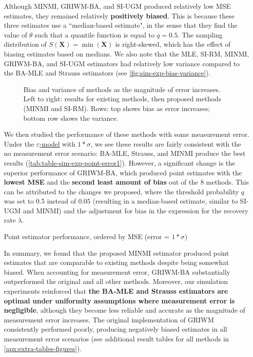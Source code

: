 Although MINMI, GRIWM-BA, and SI-UGM produced relatively low MSE estimates, they remained relatively \textbf{positively biased}. This is because these three estimates use a ``median-based estimate", in the sense that they find the value of $\theta$ such that a quantile function is equal to $q = 0.5$. The sampling distribution of $S(\bm{X}) = \min(\bm{X})$ is right-skewed, which has the effect of biasing estimates based on medians. We also note that the MLE, SI-RM, MINMI, GRIWM-BA, and SI-UGM estimators had relatively low variance compared to the BA-MLE and Strauss estimators (see \autoref{fig:sim-exp-bias-variance}).
\begin{figure}[ht]
    \centering
    
    \caption{Bias and variance of methods as the magnitude of error increases. Left to right: results for existing methods, then proposed methods (MINMI and SI-RM). Rows: top shows bias as error increases; bottom row shows the variance.}
    \label{fig:sim-exp-bias-variance}
\end{figure}

We then studied the performance of these methods with some measurement error. Under the  \hyperref[model: measurement-error]{$\varepsilon$-model} with $1*\sigma$, we see these results are fairly consistent with the no measurement error scenario: BA-MLE, Strauss, and MINMI produce the best results (\autoref{tab:table-sim-exp-point-error1}). However, a significant change is the superior performance of GRIWM-BA, which produced point estimates with the \textbf{lowest MSE} and the \textbf{second least amount of bias} out of the 8 methods. This can be attributed to the changes we proposed, where the threshold probability $q$ was set to 0.5 instead of $0.05$ (resulting in a median-based estimate, similar to SI-UGM and MINMI) and the adjustment for bias in the expression for the recovery rate $\lambda$.
\begin{table}[ht]
    \centering
    \caption{Point estimator performance, ordered by MSE (error = $1*\sigma$)}
    
    \label{tab:table-sim-exp-point-error1}
\end{table}

In summary, we found that the proposed MINMI estimator produced point estimates that are comparable to existing methods despite being somewhat biased. When accounting for measurement error, GRIWM-BA substantially outperformed the original and all other methods. Moreover, our simulation experiments reinforced that \textbf{the BA-MLE and Strauss estimators are optimal under uniformity assumptions where measurement error is negligible}, although they become less reliable and accurate as the magnitude of measurement error increases. The original implementation of GRIWM consistently performed poorly, producing negatively biased estimates in all measurement error scenarios (see additional result tables for all methods in \autoref{apx:extra-tables-figures}).

